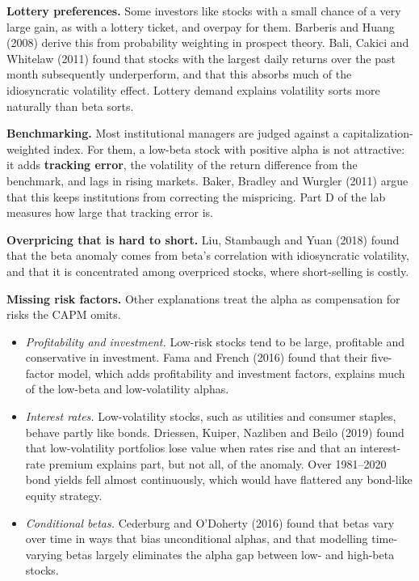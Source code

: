 \textbf{Lottery preferences.} Some investors like stocks with a small chance of a very large gain, as with a lottery ticket, and overpay for them. Barberis and Huang (2008) derive this from probability weighting in prospect theory. Bali, Cakici and Whitelaw (2011) found that stocks with the largest daily returns over the past month subsequently underperform, and that this absorbs much of the idiosyncratic volatility effect. Lottery demand explains volatility sorts more naturally than beta sorts.

\textbf{Benchmarking.} Most institutional managers are judged against a capitalization-weighted index. For them, a low-beta stock with positive alpha is not attractive: it adds \textbf{tracking error}, the volatility of the return difference from the benchmark, and lags in rising markets. Baker, Bradley and Wurgler (2011) argue that this keeps institutions from correcting the mispricing. Part D of the lab measures how large that tracking error is.

\textbf{Overpricing that is hard to short.} Liu, Stambaugh and Yuan (2018) found that the beta anomaly comes from beta's correlation with idiosyncratic volatility, and that it is concentrated among overpriced stocks, where short-selling is costly.

\textbf{Missing risk factors.} Other explanations treat the alpha as compensation for risks the CAPM omits.

\begin{itemize}
  \item \emph{Profitability and investment.} Low-risk stocks tend to be large, profitable and conservative in investment. Fama and French (2016) found that their five-factor model, which adds profitability and investment factors, explains much of the low-beta and low-volatility alphas.
  \item \emph{Interest rates.} Low-volatility stocks, such as utilities and consumer staples, behave partly like bonds. Driessen, Kuiper, Nazliben and Beilo (2019) found that low-volatility portfolios lose value when rates rise and that an interest-rate premium explains part, but not all, of the anomaly. Over 1981--2020 bond yields fell almost continuously, which would have flattered any bond-like equity strategy.
  \item \emph{Conditional betas.} Cederburg and O'Doherty (2016) found that betas vary over time in ways that bias unconditional alphas, and that modelling time-varying betas largely eliminates the alpha gap between low- and high-beta stocks.
\end{itemize}

